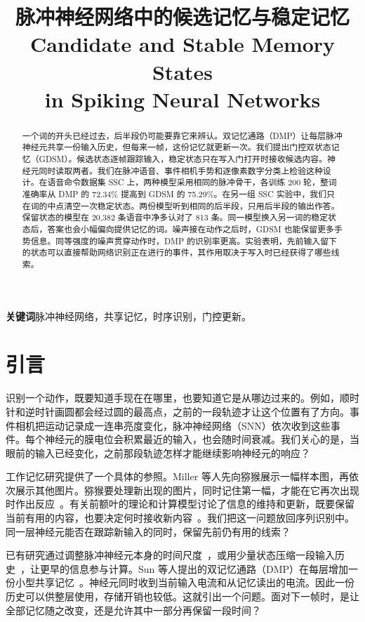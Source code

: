 \documentclass[11pt]{article}
\title{\textbf{脉冲神经网络中的候选记忆与稳定记忆}\\[.5em]\large Candidate and Stable Memory States\\in Spiking Neural Networks}
\author{}\date{}
\newcommand{\pid}[1]{\ifstrequal{#1}{摘要}{}{\leavevmode\llap{\scriptsize\sffamily #1\hspace{.65em}}}\ignorespaces}
\begin{document}
\maketitle

\begin{abstract}
\pid{摘要} 一个词的开头已经过去，后半段仍可能要靠它来辨认。双记忆通路（DMP）让每层脉冲神经元共享一份输入历史，但每来一帧，这份记忆就更新一次。我们提出门控双状态记忆（GDSM）。候选状态逐帧跟踪输入，稳定状态只在写入门打开时接收候选内容。神经元同时读取两者。我们在脉冲语音、事件相机手势和逐像素数字分类上检验这种设计。在语音命令数据集 SSC 上，两种模型采用相同的脉冲骨干，各训练 200 轮，整词准确率从 DMP 的 72.34\% 提高到 GDSM 的 75.29\%。在另一组 SSC 实验中，我们只在词的中点清空一次稳定状态。两份模型听到相同的后半段，只用后半段的输出作答。保留状态的模型在 20,382 条语音中净多认对了 813 条。同一模型换入另一词的稳定状态后，答案也会小幅偏向提供记忆的词。噪声接在动作之后时，GDSM 也能保留更多手势信息。同等强度的噪声贯穿动作时，DMP 的识别率更高。实验表明，先前输入留下的状态可以直接帮助网络识别正在进行的事件，其作用取决于写入时已经获得了哪些线索。
\end{abstract}
\noindent\textbf{关键词}\quad 脉冲神经网络，共享记忆，时序识别，门控更新。

\section{引言}
\pid{1-P1} 识别一个动作，既要知道手现在在哪里，也要知道它是从哪边过来的。例如，顺时针和逆时针画圆都会经过圆的最高点，之前的一段轨迹才让这个位置有了方向。事件相机把运动记录成一连串亮度变化，脉冲神经网络（SNN）依次收到这些事件。每个神经元的膜电位会积累最近的输入，也会随时间衰减。我们关心的是，当眼前的输入已经变化，之前那段轨迹怎样才能继续影响神经元的响应？

\pid{1-P2} 工作记忆研究提供了一个具体的参照。Miller 等人先向猕猴展示一幅样本图，再依次展示其他图片。猕猴要处理新出现的图片，同时记住第一幅，才能在它再次出现时作出反应~\cite{miller1996}。有关前额叶的理论和计算模型讨论了信息的维持和更新，既要保留当前有用的内容，也要决定何时接收新内容~\cite{millercohen,oreillyfrank}。我们把这一问题放回序列识别中。同一层神经元能否在跟踪新输入的同时，保留先前仍有用的线索？

\pid{1-P3} 已有研究通过调整脉冲神经元本身的时间尺度~\cite{glif,tclif}，或用少量状态压缩一段输入历史~\cite{lmu,hippo,s4}，让更早的信息参与计算。Sun 等人提出的双记忆通路（DMP）在每层增加一份小型共享记忆~\cite{dmp}。神经元同时收到当前输入电流和从记忆读出的电流。因此一份历史可以供整层使用，存储开销也较低。这就引出一个问题。面对下一帧时，是让全部记忆随之改变，还是允许其中一部分再保留一段时间？
\end{document}
